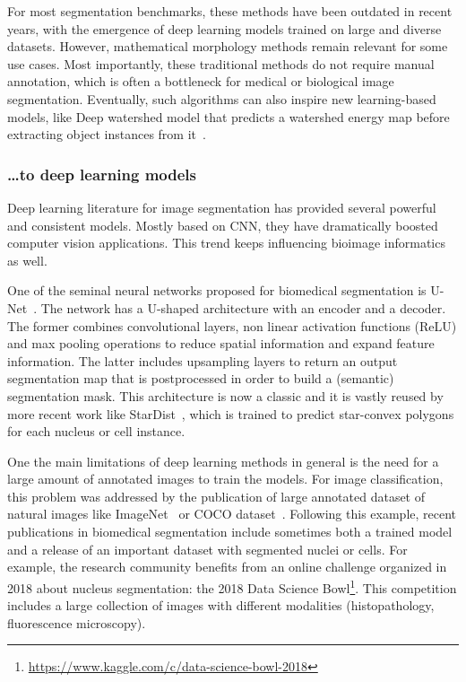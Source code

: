 For most segmentation benchmarks, these methods have been outdated in recent years, with the emergence of deep learning models trained on large and diverse datasets.
However, mathematical morphology methods remain relevant for some use cases.
Most importantly, these traditional methods do not require manual annotation, which is often a bottleneck for medical or biological image segmentation.
Eventually, such algorithms can also inspire new learning-based models, like Deep watershed model that predicts a watershed energy map before extracting object instances from it~\cite{Bai_2017_CVPR}.

\subsubsection{\dots to deep learning models}

Deep learning literature for image segmentation has provided several powerful and consistent models.
Mostly based on \ac{CNN}, they have dramatically boosted computer vision applications.
This trend keeps influencing bioimage informatics as well.

One of the seminal neural networks proposed for biomedical segmentation is U-Net~\cite{Ronneberger_unet}.
The network has a U-shaped architecture with an encoder and a decoder.
The former combines convolutional layers, non linear activation functions (ReLU) and max pooling operations to reduce spatial information and expand feature information.
The latter includes upsampling layers to return an output segmentation map that is postprocessed in order to build a (semantic) segmentation mask.
This architecture is now a classic and it is vastly reused by more recent work like StarDist~\cite{schmidt2018}, which is trained to predict star-convex polygons for each nucleus or cell instance.

One the main limitations of deep learning methods in general is the need for a large amount of annotated images to train the models.
For image classification, this problem was addressed by the publication of large annotated dataset of natural images like ImageNet~\cite{Deng_2009} or COCO dataset~\cite{Lin_2014}.
Following this example, recent publications in biomedical segmentation include sometimes both a trained model and a release of an important dataset with segmented nuclei or cells.
For example, the research community benefits from an online challenge organized in 2018 about nucleus segmentation: the 2018 Data Science Bowl\footnote{\url{https://www.kaggle.com/c/data-science-bowl-2018}}.
This competition includes a large collection of images with different modalities (histopathology, fluorescence microscopy).

